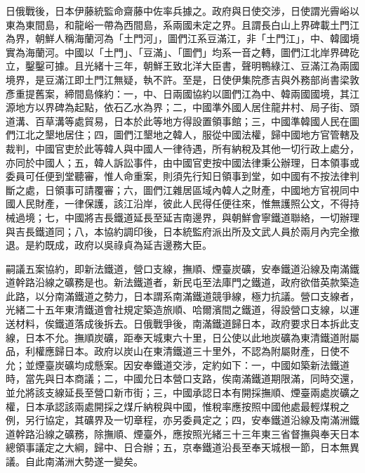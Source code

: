 \begin{pinyinscope}
日俄戰後，日本伊藤統監命齋藤中佐率兵據之。政府與日使交涉，日使謂光霽峪以東為東間島，和龍峪一帶為西間島，系兩國未定之界。且謂長白山上界碑載土門江為界，朝鮮人稱海蘭河為「土門河」，圖們江系豆滿江，非「土門江」，中、韓國境實為海蘭河。中國以「土門」、「豆滿」、「圖們」均系一音之轉，圖們江北岸界碑矻立，鑿鑿可據。且光緒十三年，朝鮮王致北洋大臣書，聲明鴨綠江、豆滿江為兩國境界，是豆滿江即土門江無疑，執不許。至是，日使伊集院彥吉與外務部尚書梁敦彥重提舊案，締間島條約：一，中、日兩國協約以圖們江為中、韓兩國國境，其江源地方以界碑為起點，依石乙水為界；二，中國準外國人居住龍井村、局子街、頭道溝、百草溝等處貿易，日本於此等地方得設置領事館；三，中國準韓國人民在圖們江北之墾地居住；四，圖們江墾地之韓人，服從中國法權，歸中國地方官管轄及裁判，中國官吏於此等韓人與中國人一律待遇，所有納稅及其他一切行政上處分，亦同於中國人；五，韓人訴訟事件，由中國官吏按中國法律秉公辦理，日本領事或委員可任便到堂聽審，惟人命重案，則須先行知日領事到堂，如中國有不按法律判斷之處，日領事可請覆審；六，圖們江雜居區域內韓人之財產，中國地方官視同中國人民財產，一律保護，該江沿岸，彼此人民得任便往來，惟無護照公文，不得持械過境；七，中國將吉長鐵道延長至延吉南邊界，與朝鮮會寧鐵道聯絡，一切辦理與吉長鐵道同；八，本協約調印後，日本統監府派出所及文武人員於兩月內完全撤退。是約既成，政府以吳祿貞為延吉邊務大臣。

嗣議五案協約，即新法鐵道，營口支線，撫順、煙臺炭礦，安奉鐵道沿線及南滿鐵道幹路沿線之礦務是也。新法鐵道者，新民屯至法庫門之鐵道，政府欲借英款築造此路，以分南滿鐵道之勢力，日本謂系南滿鐵道競爭線，極力抗議。營口支線者，光緒二十五年東清鐵道會社規定築造旅順、哈爾濱間之鐵道，得設營口支線，以運送材料，俟鐵道落成後拆去。日俄戰爭後，南滿鐵道歸日本，政府要求日本拆此支線，日本不允。撫順炭礦，距奉天城東六十里，日公使以此地炭礦為東清鐵道附屬品，利權應歸日本。政府以炭山在東清鐵道三十里外，不認為附屬財產，日使不允；並煙臺炭礦均成懸案。因安奉鐵道交涉，定約如下：一，中國如築新法鐵道時，當先與日本商議；二，中國允日本營口支路，俟南滿鐵道期限滿，同時交還，並允將該支線延長至營口新市街；三，中國承認日本有開採撫順、煙臺兩處炭礦之權，日本承認該兩處開採之煤斤納稅與中國，惟稅率應按照中國他處最輕煤稅之例，另行協定，其礦界及一切章程，亦另委員定之；四，安奉鐵道沿線及南滿洲鐵道幹路沿線之礦務，除撫順、煙臺外，應按照光緒三十三年東三省督撫與奉天日本總領事議定之大綱，歸中、日合辦；五，京奉鐵道沿長至奉天城根一節，日本無異議。自此南滿洲大勢遂一變矣。


\end{pinyinscope}
